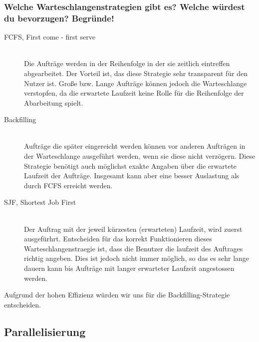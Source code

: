 	\subsubsection{Welche Warteschlangenstrategien gibt es? Welche w\"urdest du bevorzugen? Begr\"unde!}
	\begin{description}
		\item[FCFS, First come - first serve] \hfill \\
			Die Auftr\"age werden in der Reihenfolge in der sie zeitlich eintreffen abgearbeitet.
			Der Vorteil ist, das diese Strategie sehr transparent f\"ur den Nutzer ist.
			Große bzw. Lange Auftr\"age k\"onnen jedoch die Warteschlange verstopfen,
			da die erwartete Laufzeit keine Rolle f\"ur die Reihenfolge der Abarbeitung spielt.
		\item[Backfilling] \hfill \\
			Auftr\"age die sp\"ater eingereicht werden k\"onnen vor anderen Auftr\"agen in der
			Warteschlange ausgef\"uhrt werden, wenn sie diese nicht verz\"ogern.
			Diese Strategie ben\"otigt auch m\"oglichst exakte Angaben \"uber die erwartete Laufzeit
			der Auftr\"age.
			Insgesamt kann aber eine besser Auslastung als durch FCFS erreicht werden.	
		\item[SJF, Shortest Job First] \hfill \\
			Der Auftrag mit der jeweil k\"urzesten (erwarteten) Laufzeit, wird zuerst ausgef\"urhrt.
			Entscheiden f\"ur das korrekt Funktionieren dieses Warteschlangenstraegie ist,
			dass die Benutzer die laufzeit des Auftrages richtig angeben.
			Dies ist jedoch nicht immer m\"oglich,
			so das es sehr lange dauern kann bis Auftr\"age mit langer erwarteter Laufzeit angestossen werden.
	\end{description}
	Aufgrund der hohen Effizienz w\"urden wir uns für die Backfilling-Strategie entscheiden.
\subsection{Parallelisierung}
